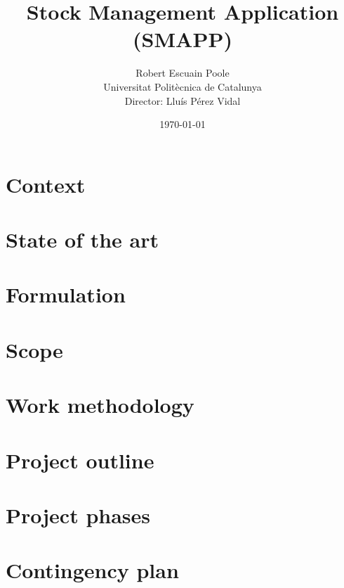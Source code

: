 \documentclass{report}
\begin{document}
    \title{\bfseries Stock Management Application (SMAPP)}
    \author{Robert Escuain Poole\\[\bigskipamount]Universitat Politècnica de Catalunya\\Director: Lluís Pérez Vidal}
    \date{\today}
    \maketitle

    \tableofcontents

    \chapter{Context}
    
    
    \chapter{State of the art}
    
    
    \chapter{Formulation}
    
    
    \chapter{Scope}
    
    
    \chapter{Work methodology}
    
    
    \chapter{Project outline}
    
    
    \chapter{Project phases}
    
    
    \chapter{Contingency plan}
    
    
\end{document}
